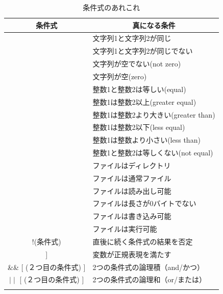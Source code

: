 \documentclass[a4j]{ltjreport}
\begin{document}
    \begin{center}
        \begin{longtable}{|c|l|}
            \hline
            \multicolumn{1}{|c|}{\textbf{条件式}}&\multicolumn{1}{|c|}{\textbf{真になる条件}}\\
            \hline\hline
            [ 文字列1 = 文字列2 ] & 文字列1と文字列2が同じ \\
            \hline
            [ 文字列1 != 文字列2 ] & 文字列1と文字列2が同じでない\\
            \hline
            [ -n 文字列 ]  & 文字列が空でない(not zero) \\
            \hline
            [ -z 文字列 ]  & 文字列が空(zero) \\
            \hline
            [ 整数1 -eq 整数2 ] & 整数1と整数2は等しい(equal) \\
            \hline
            [ 整数1 -ge 整数2 ] & 整数1は整数2以上(greater equal)   \\
            \hline
            [ 整数1 -gt 整数2 ] & 整数1は整数2より大きい(greater than)  \\
            \hline
            [ 整数1 -le 整数2 ] & 整数1は整数2以下(less equal)  \\
            \hline
            [ 整数1 -lt 整数2 ] & 整数1は整数より小さい(less than)  \\
            \hline
            [ 整数1 -ne 整数2 ] & 整数1と整数2は等しくない(not equal) \\
            \hline
            [ -d ファイル名 ] & ファイルはディレクトリ \\
            \hline
            [ -f ファイル名 ] & ファイルは通常ファイル \\
            \hline
            [ -r ファイル名 ] & ファイルは読み出し可能 \\
            \hline
            [ -s ファイル名 ] & ファイルは長さが0バイトでない \\
            \hline
            [ -w ファイル名 ] & ファイルは書き込み可能 \\
            \hline
            [ -x ファイル名 ] & ファイルは実行可能 \\
            \hline
            !(条件式) & 直後に続く条件式の結果を否定 \\
            \hline
            [[ (変数) =$\sim$ (正規表現) ]] & 変数が正規表現を満たす\\
            \hline
            [ (１つ目の条件式) ] \&\& [ (２つ目の条件式) ]& 2つの条件式の論理積（and/かつ）\\
            \hline
            [ (１つ目の条件式) ] $\mid\mid$ [ (２つ目の条件式) ] & 2つの条件式の論理和（or/または）\\
            \hline
            \caption{条件式のあれこれ}
        \end{longtable}
    \end{center}
\end{document}
